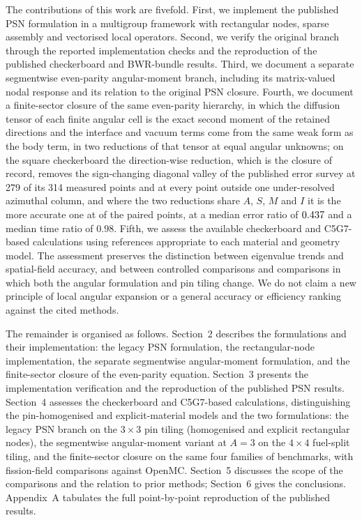 \documentclass[11pt,a4paper]{article}
\begin{document}
The contributions of this work are fivefold. First, we implement the
published PSN formulation in a multigroup framework with rectangular
nodes, sparse assembly and vectorised local operators. Second, we
verify the original branch through the reported implementation checks
and the reproduction of the published checkerboard and BWR-bundle
results. Third, we document a separate segmentwise even-parity
angular-moment branch, including its matrix-valued nodal response and
its relation to the original PSN closure. Fourth, we document a
finite-sector closure of the same even-parity hierarchy, in which the
diffusion tensor of each finite angular cell is the exact second moment
of the retained directions and the interface and vacuum terms come from
the same weak form as the body term, in two reductions of that tensor at
equal angular unknowns; on the square checkerboard the direction-wise
reduction, which is the closure of record, removes the sign-changing
diagonal valley of the published error survey at 279 of its 314 measured
points and at every point outside one under-resolved azimuthal column, and
where the two reductions share $A$, $S$, $M$ and $I$ it is the more accurate
one at \StudyFourSmaller{} of the \StudyFourPairs{} paired points, at a median error ratio of $0.437$ and a
median time ratio of $0.98$. Fifth, we assess the
available checkerboard and C5G7-based calculations using references
appropriate to each material and geometry model. The assessment
preserves the distinction between eigenvalue trends and spatial-field
accuracy, and between controlled comparisons and comparisons in which
both the angular formulation and pin tiling change. We do not claim a
new principle of local angular expansion or a general accuracy or
efficiency ranking against the cited methods.

The remainder is organised as follows. Section~2 describes the
formulations and their implementation: the legacy PSN formulation, the
rectangular-node implementation, the separate segmentwise
angular-moment formulation, and the finite-sector closure of the
even-parity equation. Section~3 presents the implementation
verification and the reproduction of the published PSN results.
Section~4 assesses the checkerboard and C5G7-based
calculations, distinguishing the pin-homogenised and explicit-material
models and the two formulations: the legacy PSN branch on the
$3\times3$ pin tiling (homogenised and explicit rectangular nodes),
the segmentwise angular-moment variant at $A{=}3$ on the $4\times4$
fuel-split tiling, and the finite-sector closure on the same four
families of benchmarks, with fission-field comparisons against OpenMC. Section~5 discusses the scope
of the comparisons and the relation to prior methods; Section~6 gives
the conclusions. Appendix~A tabulates the full point-by-point
reproduction of the published results.
\end{document}
